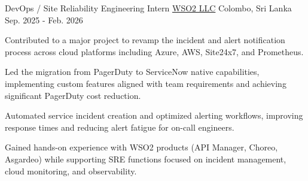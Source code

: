 

\begin{cventries}

  \cventry
    {DevOps / Site Reliability Engineering Intern} %
    {\href{https://wso2.com}{WSO2 LLC}} %
    {Colombo, Sri Lanka} %
    {Sep. 2025 - Feb. 2026} %
    {
      \begin{cvitems} %
        \item {Contributed to a major project to revamp the incident and alert notification process across cloud platforms including Azure, AWS, Site24x7, and Prometheus.}
        \item {Led the migration from PagerDuty to ServiceNow native capabilities, implementing custom features aligned with team requirements and achieving significant PagerDuty cost reduction.}
        \item {Automated service incident creation and optimized alerting workflows, improving response times and reducing alert fatigue for on-call engineers.}
        \item {Gained hands-on experience with WSO2 products (API Manager, Choreo, Asgardeo) while supporting SRE functions focused on incident management, cloud monitoring, and observability.}
      \end{cvitems}
    }

\end{cventries}
